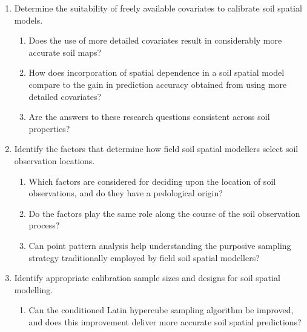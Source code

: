 \begin{enumerate}
 \item Determine the suitability of freely available covariates to calibrate soil spatial models.
  \begin{enumerate}[label=(\alph*)]
   \item Does the use of more detailed covariates result in considerably more accurate soil maps?
   \item How does incorporation of spatial dependence in a soil spatial model compare to the gain in 
   prediction accuracy obtained from using more detailed covariates?
   \item Are the answers to these research questions consistent across soil properties?
  \end{enumerate}
 
 \item Identify the factors that determine how field soil spatial modellers select soil observation locations.
  \begin{enumerate}[label=(\alph*)]
   \item Which factors are considered for deciding upon the location of soil observations, and do they have a 
   pedological origin?
   \item Do the factors play the same role along the course of the soil observation process?
   \item Can point pattern analysis help understanding the purposive sampling strategy traditionally employed
   by field soil spatial modellers?
  \end{enumerate}

  \item Identify appropriate calibration sample sizes and designs for soil spatial modelling.
  \begin{enumerate}[label=(\alph*)]
   \item Can the conditioned Latin hypercube sampling algorithm be improved, and does this
   improvement deliver more accurate soil spatial predictions?
  \end{enumerate}
\end{enumerate}

